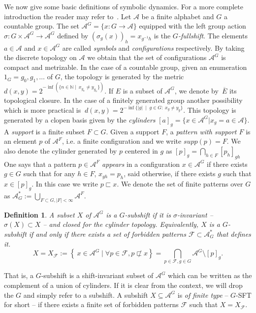 \documentclass[letterpaper]{article}
\theoremstyle{plain}
\newtheorem{definition}{Definition}[section]
\def\NN{\mathbb{N}}
\def\ag{\mathcal{A}}
\def\FF{\mathcal{F}}
\newcommand{\define}[1]{\emph{#1}}
\newcommand{\cor}[2][]{#2}
\begin{document}
	
	We now give some basic definitions of symbolic dynamics. For a more complete introduction the reader may refer to~\cite{lind1995introduction,ceccherini-SilbersteinC09}. Let $\ag$ be a finite alphabet and $G$ a countable group. The set $\ag^G = \{ x: G \to \ag\}$ equipped with the left group action $\sigma: G \times \ag^G \to \ag^G$ defined by $(\sigma_g(x))_h = x_{g^{-1}h}$ is the \textit{$G$-fullshift}. The elements $a \in \ag$ and $x \in \ag^G$ are called \define{symbols} and \define{configurations} respectively. By taking the discrete topology on $\ag$ we obtain that the set of configurations $\ag^G$ is compact and metrizable. In the case of a countable group, given an enumeration $1_G = g_0,g_1,\dots$ of $G$, the topology is generated by the metric $d(x,y) = 2^{-\inf (\{ n \in \NN \mid\ x_{g_n} \neq y_{g_n}  \})}$. If $E$ is a subset of $\ag^G$, we denote by~$\overline{E}$ its topological closure. In the case of a finitely generated group another possibility which is more practical is $\
\displaystyle{d(x,y) = 2^{-\inf\{|g|\; \mid\; g \in G:\; x_g \neq y_g\}}}$. This topology is generated by a clopen basis given by the \define{cylinders} $[a]_g = \{x \in \ag^G | x_g = a\in \ag\}$. A \emph{support} is a finite subset $F \subset G$. Given a support $F$, a \emph{pattern with support $F$} is an element $p$ of $\ag^F$, i.e. a finite configuration and we write $supp(p) = F$. We also denote the cylinder generated by $p$ centered in $g$ as $[p]_g = \bigcap_{h \in F}[p_h]_{gh}$
	One says that a pattern $p\in \ag^{F}$ \emph{appears} in a configuration $x \in \ag^G$ if there exists $g \in G$ such that for any $h \in F$, $x_{gh} = p_h$, said otherwise, if there exists $g$ such that $x \in [p]_g$. In this case we write $p \sqsubset x$. We denote the set of finite patterns over $G$ as $\ag_G^* := \bigcup_{F \subset G, |F| < \infty}{\ag^F}$.
	\begin{definition}
		A subset $X$ of $\ag^G$ is a \define{$G$-subshift} if it is $\sigma$-invariant -- $\sigma(X)\subset X$ -- and closed for the cylinder topology. Equivalently, $X$ is a $G$-subshift if and only if there exists a set of forbidden patterns $\FF \subset \ag_G^*$ that defines it.
		$$X=X_\FF := \left\{\ x\in \ag^G\mid \forall p \in \FF, p \not\sqsubset x \right\} = \bigcap_{p \in \FF, g \in G}{\ag^G \setminus [p]_g}.$$
	\end{definition}
	
	That is, a $G$-subshift is a shift-invariant subset of $\ag^G$ which can be written as the complement of a union of cylinders.
	If \cor[the context is clear enough]{it is clear from the context}, we will drop the $G$ and simply refer to a subshift. A subshift $X\subseteq \ag^G$ is \define{of finite type} -- $G$-SFT for short -- if there exists a finite set of forbidden patterns $\FF$ such that $X=X_\FF$. 
	
\end{document}
